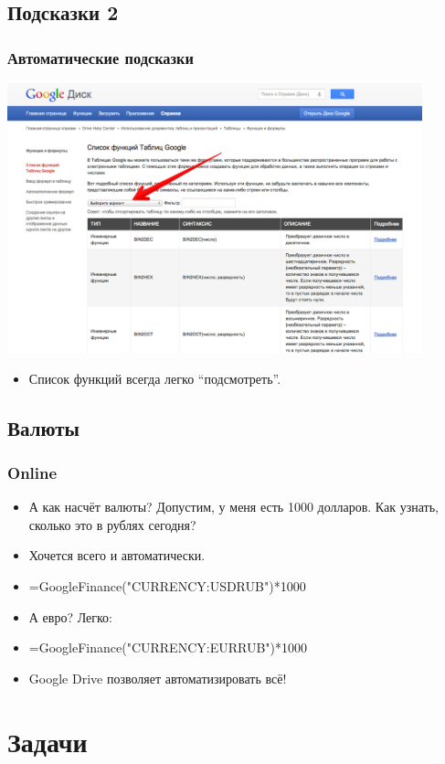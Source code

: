 \documentclass[compress,red]{beamer}
\begin{document}
\subsection{Подсказки 2}
\begin{frame}[fragile]
  \frametitle{Автоматические подсказки}
  \centerline{\includegraphics[width=0.9\textwidth]{images/10-2.png}}
  \begin{itemize}
      \item Список функций всегда легко ``подсмотреть''.
  \end{itemize}
\end{frame}

\subsection{Валюты}
\begin{frame}[fragile]
  \frametitle{Online}
  \begin{itemize}[<+->]
    \item А как насчёт валюты? Допустим, у меня есть 1000 долларов. Как узнать, сколько это в рублях сегодня?
    \item Хочется всего и автоматически.
    \item =GoogleFinance("CURRENCY:USDRUB")*1000
    \item А евро? Легко:
    \item =GoogleFinance("CURRENCY:EURRUB")*1000
    \item Google Drive позволяет автоматизировать всё!
  \end{itemize}
\end{frame}

\section{Задачи}
\end{document}
